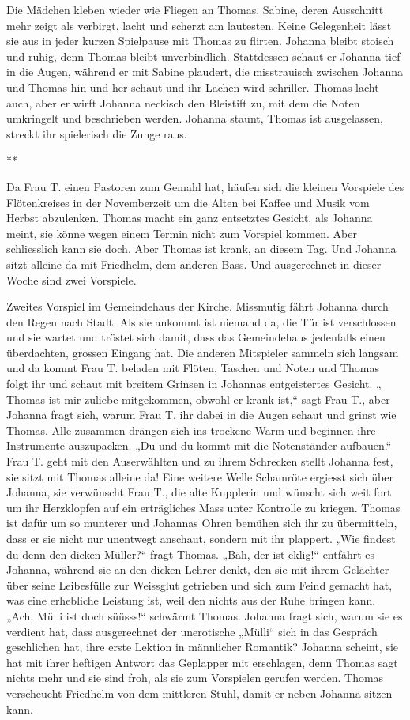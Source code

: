 \documentclass[10pt,titlepage,a5paper]{book}
\newcommand{\sterne}{\par{\centering ***\par}}
\begin{document}
Die Mädchen kleben wieder wie Fliegen an Thomas. Sabine, deren Ausschnitt mehr zeigt als verbirgt, lacht und scherzt am lautesten. Keine Gelegenheit lässt sie aus in jeder kurzen Spielpause mit Thomas zu flirten. Johanna bleibt stoisch und ruhig, denn Thomas bleibt unverbindlich. Stattdessen schaut er Johanna tief in die Augen, während er mit Sabine plaudert, die misstrauisch zwischen Johanna und Thomas hin und her schaut und ihr Lachen wird schriller. Thomas lacht auch, aber er wirft Johanna neckisch den Bleistift zu, mit dem die Noten umkringelt und beschrieben werden. Johanna staunt, Thomas ist ausgelassen, streckt ihr spielerisch die Zunge raus.



\sterne


Da Frau T. einen Pastoren zum Gemahl  hat, häufen sich die kleinen Vorspiele des Flötenkreises  in der Novemberzeit um die Alten bei Kaffee und Musik vom Herbst abzulenken. Thomas macht ein ganz entsetztes Gesicht, als Johanna meint, sie könne wegen einem Termin nicht zum Vorspiel kommen. Aber schliesslich kann sie doch. Aber Thomas ist krank, an diesem Tag. Und Johanna sitzt alleine da mit Friedhelm, dem anderen Bass. Und ausgerechnet in dieser Woche sind zwei Vorspiele.

 Zweites Vorspiel im Gemeindehaus der Kirche. Missmutig fährt Johanna durch den Regen nach Stadt. Als sie ankommt ist niemand da, die Tür ist verschlossen und sie wartet und tröstet sich damit, dass das Gemeindehaus jedenfalls einen überdachten, grossen Eingang hat. Die anderen Mitspieler sammeln sich langsam und da kommt Frau T. beladen mit  Flöten, Taschen und Noten und Thomas folgt ihr und schaut mit breitem Grinsen in Johannas entgeistertes Gesicht. „ Thomas ist mir zuliebe mitgekommen, obwohl er krank ist,“ sagt Frau T., aber Johanna fragt sich, warum Frau T.  ihr dabei in die Augen schaut und grinst wie Thomas. Alle zusammen drängen sich ins trockene Warm und beginnen ihre Instrumente auszupacken. „Du und du kommt mit die Notenständer aufbauen.“ Frau T. geht mit den Auserwählten und zu ihrem Schrecken stellt Johanna fest, sie sitzt mit Thomas alleine da! Eine weitere Welle Schamröte ergiesst sich über Johanna, sie verwünscht Frau T., die alte Kupplerin und wünscht sich weit fort um ihr Herzklopfen auf ein erträgliches Mass unter Kontrolle zu kriegen. Thomas ist dafür um so munterer und Johannas Ohren bemühen sich ihr zu übermitteln, dass er sie nicht nur unentwegt anschaut, sondern mit ihr plappert. „Wie findest du denn den dicken Müller?“ fragt Thomas. „Bäh, der ist eklig!“ entfährt es Johanna, während sie an den dicken Lehrer denkt, den sie mit ihrem Gelächter über seine Leibesfülle zur Weissglut getrieben und sich zum Feind gemacht hat, was eine erhebliche Leistung ist, weil den nichts aus der Ruhe bringen kann. „Ach, Mülli ist doch süüsss!“ schwärmt Thomas. Johanna fragt sich, warum sie es verdient hat, dass ausgerechnet der unerotische „Mülli“ sich in das Gespräch geschlichen hat, ihre erste Lektion in männlicher Romantik? Johanna scheint, sie hat mit ihrer heftigen Antwort das Geplapper mit erschlagen, denn Thomas sagt nichts mehr  und sie sind froh, als sie zum Vorspielen gerufen werden. Thomas verscheucht Friedhelm von dem mittleren Stuhl, damit er neben Johanna sitzen kann.
 
\end{document}
